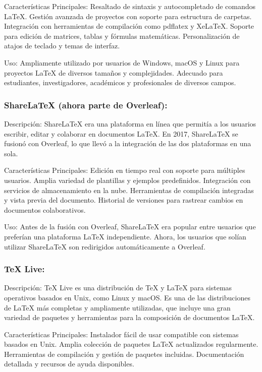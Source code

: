 \documentclass{article}
\begin{document}
Características Principales:
Resaltado de sintaxis y autocompletado de comandos LaTeX.
Gestión avanzada de proyectos con soporte para estructura de carpetas.
Integración con herramientas de compilación como pdflatex y XeLaTeX.
Soporte para edición de matrices, tablas y fórmulas matemáticas.
Personalización de atajos de teclado y temas de interfaz.

Uso:
Ampliamente utilizado por usuarios de Windows, macOS y Linux para proyectos LaTeX de diversos tamaños y complejidades.
Adecuado para estudiantes, investigadores, académicos y profesionales de diversos campos.


\subsubsection{ShareLaTeX (ahora parte de Overleaf):}

Descripción: ShareLaTeX era una plataforma en línea que permitía a los usuarios escribir, editar y colaborar en documentos LaTeX. En 2017, ShareLaTeX se fusionó con Overleaf, lo que llevó a la integración de las dos plataformas en una sola.

Características Principales:
Edición en tiempo real con soporte para múltiples usuarios.
Amplia variedad de plantillas y ejemplos predefinidos.
Integración con servicios de almacenamiento en la nube.
Herramientas de compilación integradas y vista previa del documento.
Historial de versiones para rastrear cambios en documentos colaborativos.

Uso:
Antes de la fusión con Overleaf, ShareLaTeX era popular entre usuarios que preferían una plataforma LaTeX independiente.
Ahora, los usuarios que solían utilizar ShareLaTeX son redirigidos automáticamente a Overleaf.


\subsubsection{TeX Live:}

Descripción: TeX Live es una distribución de TeX y LaTeX para sistemas operativos basados en Unix, como Linux y macOS. Es una de las distribuciones de LaTeX más completas y ampliamente utilizadas, que incluye una gran variedad de paquetes y herramientas para la composición de documentos LaTeX.

Características Principales:
Instalador fácil de usar compatible con sistemas basados en Unix.
Amplia colección de paquetes LaTeX actualizados regularmente.
Herramientas de compilación y gestión de paquetes incluidas.
Documentación detallada y recursos de ayuda disponibles.
\end{document}
